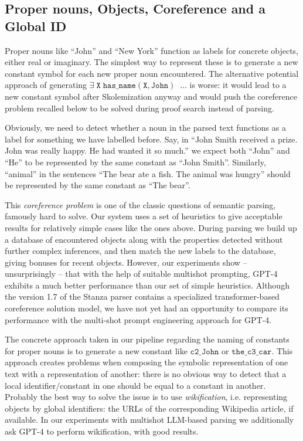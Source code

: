 \documentclass[runningheads]{llncs}
\begin{document}
\subsection{Proper nouns, Objects, Coreference and a Global ID}

Proper nouns like ``John'' and ``New York'' function as labels for concrete objects,
either real or imaginary. The simplest way to represent these is to generate
a new constant symbol for each new proper noun encountered. The alternative potential
approach of generating $\mathtt{\exists \; X \; has\_name(X,John) \; \; \ldots}$ is worse: it 
would lead to a new constant symbol after Skolemization anyway and would push the
coreference problem recalled below to be solved during proof search instead of
parsing.

Obviously, we need to detect
whether a noun in the parsed text functions as a label for something we have labelled before. 
Say, in ``John Smith
received a prize. John was really happy. He had wanted it so much.'' we expect both 
``John'' and ``He'' to be represented by the same constant as ``John Smith''. 
Similarly, ``animal'' in the sentences ``The bear ate a fish. The animal was hungry'' 
should be represented by the same constant as ``The bear''.

This {\em coreference problem} is one of the classic questions of semantic parsing,
famously hard to solve. Our system uses a set of heuristics to give acceptable
results for relatively simple cases like the ones above. 
During parsing we build up a database of encountered objects along with the 
properties detected without further complex inferences, and then match the new labels 
to the database, giving bonuses for recent objects. However, our experiments show
-- unsurprisingly -- that with the help of suitable multishot prompting, GPT-4 exhibits
a much better performance than our set of simple heuristics. Although the version 1.7 of the
Stanza parser contains a specialized transformer-based coreference solution model,
we have not yet had an opportunity to compare its performance with the multi-shot
prompt engineering approach for GPT-4.

The concrete approach taken in our pipeline regarding the naming of constants for proper nouns is
to generate a new constant like $\mathtt{c2\_John}$  or $\mathtt{the\_c3\_car}$.
This approach creates problems when
composing the symbolic representation of one text with a representation of
another: there is no obvious way to detect that a local identifier/constant in one should
be equal to a constant in another. Probably the best
way to solve the issue is to use {\em wikification}, i.e. representing objects by 
global identifiers: the URLs of the corresponding Wikipedia article, if available. 
In our experiments with multishot LLM-based parsing we additionally ask GPT-4
to perform wikification, with good results.
\end{document}
